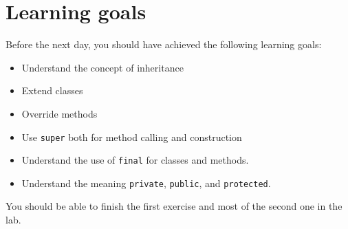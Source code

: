 \documentclass{article}
\begin{document}
\section*{Learning goals}
\label{sec:learning-goals}

Before the next day, you should have achieved the following learning
goals: 

\begin{itemize}
\item Understand the concept of inheritance
\item Extend classes
\item Override methods
\item Use \verb+super+ both for method calling and construction
\item Understand the use of \verb+final+ for classes and methods. 
\item Understand the meaning \verb+private+, \verb+public+, and \verb+protected+.
\end{itemize}

You should be able to finish the first exercise and most of the second
one in the lab.


\end{document}
